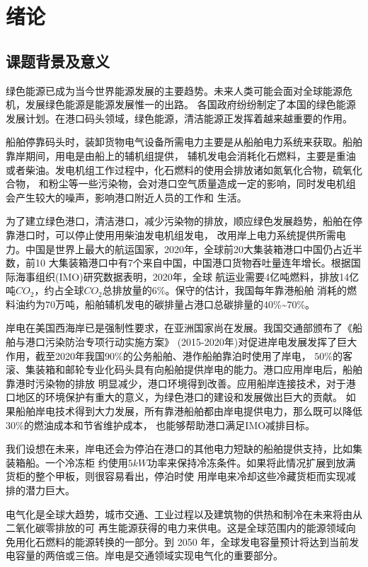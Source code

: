 \chapter{绪论}

\section{课题背景及意义}
绿色能源已成为当今世界能源发展的主要趋势。未来人类可能会面对全球能源危机，发展绿色能源是能源发展惟一的出路。
各国政府纷纷制定了本国的绿色能源发展计划。在港口码头领域，绿色能源，清洁能源正发挥着越来越重要的作用。

船舶停靠码头时，装卸货物电气设备所需电力主要是从船舶电力系统来获取。船舶靠岸期间，用电是由船上的辅机组提供，
辅机发电会消耗化石燃料，主要是重油或者柴油。发电机组工作过程中，化石燃料的使用会排放诸如氮氧化合物，硫氧化合物，
和粉尘等一些污染物，会对港口空气质量造成一定的影响，同时发电机组会产生较大的噪声，影响港口附近人员的工作和
生活。

为了建立绿色港口，清洁港口，减少污染物的排放，顺应绿色发展趋势，船舶在停靠港口时，可以停止使用用柴油发电机组发电，
改用岸上电力系统提供所需电力。中国是世界上最大的航运国家，2020年，全球前20大集装箱港口中国仍占近半数，前10
大集装箱港口中有7个来自中国，中国港口货物吞吐量连年增长。根据国际海事组织(IMO)研究数据表明，2020年，全球
航运业需要4亿吨燃料，排放14亿吨$CO_{2}$，约占全球$CO_{2}$总排放量的$6\%$。保守的估计，我国每年靠港船舶
消耗的燃料油约为$70$万吨，船舶辅机发电的碳排量占港口总碳排量的40\%\~{}70\%\cite{SP1}。

岸电在美国西海岸已是强制性要求，在亚洲国家尚在发展。我国交通部颁布了《船舶与港口污染防治专项行动实施方案》
(2015-2020年)对促进岸电发展发挥了巨大作用，截至2020年我国$90\%$的公务船舶、港作船舶靠泊时使用了岸电，
$50\%$的客滚、集装箱和邮轮专业化码头具有向船舶提供岸电的能力。港口应用岸电后，船舶靠港时污染物的排放
明显减少，港口环境得到改善。应用船岸连接技术，对于港口地区的环境保护有重大的意义，为绿色港口的建设和发展做出巨大的贡献。
如果船舶岸电技术得到大力发展，所有靠港船舶都由岸电提供电力，那么既可以降低$30\%$的燃油成本\cite{SP2}和节省维护成本，
也能够帮助港口满足IMO减排目标。

我们设想在未来，岸电还会为停泊在港口的其他电力短缺的船舶提供支持，比如集装箱船。一个冷冻柜
约使用$5kW$功率来保持冷冻条件。如果将此情况扩展到放满货柜的整个甲板，则很容易看出，停泊时使
用岸电来冷却这些冷藏货柜而实现减排的潜力巨大。

电气化是全球大趋势，城市交通、工业过程以及建筑物的供热和制冷在未来将由从二氧化碳零排放的可
再生能源获得的电力来供电。这是全球范围内的能源领域向免用化石燃料的能源转换的一部分。到 2050
年，全球发电容量预计将达到当前发电容量的两倍或三倍。岸电是交通领域实现电气化的重要部分。





